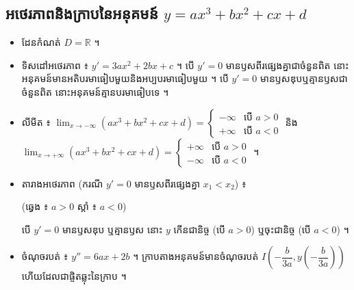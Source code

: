 \begin{center}
\end{center}

\subsection{អថេរភាពនិងក្រាបនៃអនុគមន៍ \texorpdfstring{$y = ax^3 + bx^2 + cx + d$}{y = ax3 + bx2 + cx + d}}

\begin{itemize}
  \item ដែនកំណត់ $D = \mathbb{R}$ ។
  \item ទិសដៅអថេរភាព ៖ $y' = 3ax^2 + 2bx + c$ ។ បើ $y' = 0$ មានឫសពីរផ្សេងគ្នាជាចំនួនពិត នោះអនុគមន៍មានអតិបរមាធៀបមួយនិងអប្បបរមាធៀបមួយ ។ បើ $y' = 0$ មានឫសឌុបឬគ្មានឫសជាចំនួនពិត នោះអនុគមន៍គ្មានបរមាធៀបទេ ។
  \item លីមីត ៖ $\displaystyle\lim_{x \to -\infty}(ax^3 + bx^2 + cx + d) = \begin{cases} -\infty & \text{បើ } a > 0\\ +\infty & \text{បើ } a < 0 \end{cases}$ និង $\displaystyle\lim_{x \to +\infty}(ax^3 + bx^2 + cx + d) = \begin{cases} +\infty & \text{បើ } a > 0\\ -\infty & \text{បើ } a < 0 \end{cases}$ ។
  \item តារាងអថេរភាព (ករណី $y' = 0$ មានឫសពីរផ្សេងគ្នា $x_1 < x_2$) ៖
  \begin{center}
  \quad

  \small (ឆ្វេង ៖ $a > 0$ \qquad ស្ដាំ ៖ $a < 0$)
  \end{center}
  បើ $y' = 0$ មានឫសឌុប ឬគ្មានឫស នោះ $y$ កើនជានិច្ច (បើ $a > 0$) ឬចុះជានិច្ច (បើ $a < 0$) ។
  \item ចំណុចរបត់ ៖ $y'' = 6ax + 2b$ ។ ក្រាបតាងអនុគមន៍មានចំណុចរបត់ $I\left(-\dfrac{b}{3a}, y\left(-\dfrac{b}{3a}\right)\right)$ ហើយដែលជាផ្ចិតឆ្លុះនៃក្រាប ។
\end{itemize}

